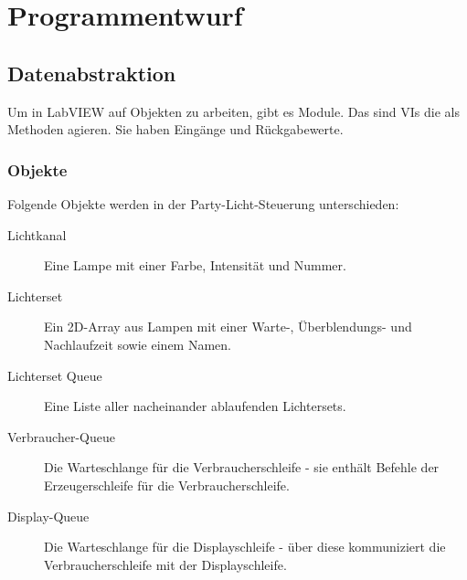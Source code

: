 \section{Programmentwurf}
\subsection{Datenabstraktion}
Um in LabVIEW auf Objekten zu arbeiten, gibt es Module. Das sind VIs die als Methoden agieren. Sie haben Eingänge und Rückgabewerte.
\subsubsection{Objekte}
Folgende Objekte werden in der Party-Licht-Steuerung unterschieden:
\begin{description}
\item[Lichtkanal]Eine Lampe mit einer Farbe, Intensität und Nummer.
\item[Lichterset]Ein 2D-Array aus Lampen mit einer Warte-, Überblendungs- und Nachlaufzeit sowie einem Namen.
\item[Lichterset Queue] Eine Liste aller nacheinander ablaufenden Lichtersets.

\item[Verbraucher-Queue]Die Warteschlange für die Verbraucherschleife - sie enthält Befehle der Erzeugerschleife für die Verbraucherschleife. 



\item[Display-Queue]Die Warteschlange für die Displayschleife - über diese kommuniziert die Verbraucherschleife mit der Displayschleife. 

\end{description}


